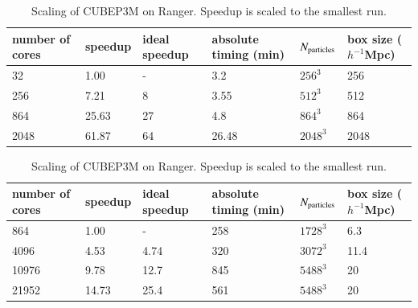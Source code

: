 \documentclass[useAMS,usenatbib]{mn2e}
\begin{document}
\begin{table}%
  \vskip -0.5cm 
  \begin{center}
\caption{Scaling of {\small CUBEP3M} on Curie. Speedup is 
scaled to the smallest run.}
\label{summary_scaling_table}
\begin{tabular}{@{}|llllll|}
\hline
number of cores & speedup & ideal speedup & absolute timing (min) & 
$N_{\rm particles}$& box size ($h^{-1}$Mpc)
\\[2mm]\hline
32  &  1.00 & - &3.2 & $256^3$ & 256\\
256  & 7.21 & 8 &3.55 & $512^3$  & 512\\
864  & 25.63 & 27 &4.8 & $864^3$  & 864\\
2048  & 61.87 & 64 &26.48 & $2048^3$ & 2048 \\
\hline
\end{tabular}
\caption{Scaling of  {\small CUBEP3M} on Ranger. Speedup is scaled to the smallest run.}
\label{summary_scaling_table2}
\begin{tabular}{@{}|llllll|}
\hline
number of cores & speedup & ideal speedup & absolute timing (min) & 
$N_{\rm particles}$& box size ($h^{-1}$Mpc)
\\[2mm]\hline
864    & 1.00  & -    &258   & $1728^3$  & 6.3\\
4096   & 4.53  & 4.74 &320   & $3072^3$  & 11.4\\
10976  & 9.78  & 12.7 &845   & $5488^3$  & 20\\
21952  & 14.73 & 25.4 &561   & $5488^3$  & 20 \\
\hline
\end{tabular}
\end{center}
  \vskip -0.7cm 
\end{table}

\end{document}
